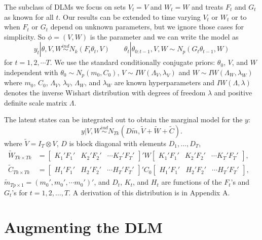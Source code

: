 \documentclass[12pt]{article}
\begin{document}
The subclass of DLMs we focus on sets $V_t=V$ and $W_t=W$ and treats $F_{t}$ and $G_{t}$ as known for all $t$. Our results can be extended to time varying $V_t$ or $W_t$ or to when $F_t$ or $G_t$ depend on unknown parameters, but we ignore those cases for simplicity. So $\phi=(V,W)$ is the parameter and we can write the model as \vspace{-.3cm}
\[
y_t|\theta,V,W \stackrel{ind}{\sim}  N_k(F_t\theta_t,V) \qquad \theta_t|\theta_{0:t-1},V,W  \sim  N_p(G_t\theta_{t-1},W) \label{dlmbotheqs}
\]
for $t=1,2,\cdots T$. We use the standard conditionally conjugate priors: $\theta_0$, $V$, and $W$ independent with $\theta_0 \sim N_p(m_0, C_0)$, $V \sim IW(\Lambda_V, \lambda_V)$ and $W \sim IW(\Lambda_W, \lambda_W)$ where $m_0$, $C_0$, $\Lambda_V$, $\lambda_V$, $\Lambda_W$, and $\lambda_W$ are known hyperparameters and $IW(\Lambda, \lambda)$ denotes the inverse Wishart distribution with degrees of freedom $\lambda$ and positive definite scale matrix $\Lambda$.

The latent states can be integrated out to obtain the marginal model for the $y$: \vspace{-.3cm}
\[
  y|V,W \stackrel{ind}{\sim} N_{Tk}(D\tilde{m}, \tilde{V} + \tilde{W} + \tilde{C}). \label{margmodel}
\] 
where $\tilde{V}=I_T\otimes V$, $D$ is block diagonal with elements $D_1,\ldots,D_T$, \vspace{-.2cm}
\begin{align*}
\tilde{W}_{Tk\times Tk} &= \begin{bmatrix} K_1'F_1' & K_2'F_2' & \cdots K_T'F_T' \end{bmatrix}' W \begin{bmatrix} K_1'F_1' & K_2'F_2' & \cdots K_T'F_T' \end{bmatrix}, &\\
\tilde{C}_{Tk\times Tk} &= \begin{bmatrix} H_1'F_1' & H_2'F_2' & \cdots H_T'F_T' \end{bmatrix}' C_0 \begin{bmatrix} H_1'F_1' & H_2'F_2' & \cdots H_T'F_T' \end{bmatrix},&
\end{align*}
$\tilde{m}_{Tp\times 1} = (m_0', m_0', \cdots m_0')'$, and $D_t$, $K_t$, and $H_t$ are functions of the $F_t$'s and $G_t$'s for $t=1,2,\dots,T$. A derivation of this distribution is in Appendix A.



\section{Augmenting the DLM}\label{sec:DAs}
\end{document}

